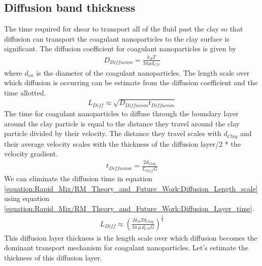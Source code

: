 \documentclass[letterpaper,10pt,english]{sphinxmanual}
\begin{document}
\subsection{Diffusion band thickness}
\label{\detokenize{Rapid_Mix/RM_Theory_and_Future_Work:diffusion-band-thickness}}
The time required for shear to transport all of the fluid past the clay so that diffusion can transport the coagulant nanoparticles to the clay surface is significant. The diffusion coefficient for coagulant nanoparticles is given by
\begin{equation}\label{equation:Rapid_Mix/RM_Theory_and_Future_Work:Rapid_Mix/RM_Theory_and_Future_Work:0}
\begin{split}D_{Diffusion} = \frac{k_B T}{3 \pi \mu d_{CN}}\end{split}
\end{equation}
where \(d_{cn}\) is the diameter of the coagulant nanoparticles. The length scale over which diffusion is occurring can be estimate from the diffusion coefficient and the time allotted.
\begin{equation}\label{equation:Rapid_Mix/RM_Theory_and_Future_Work:Diffusion_Length_scale}
\begin{split}L_{Diff} \approx \sqrt{D_{Diffusion} t_{Diffusion}}\end{split}
\end{equation}
The time for coagulant nanoparticles to diffuse through the boundary layer around the clay particle is equal to the distance they travel around the clay particle divided by their velocity. The distance they travel scales with \(d_{Clay}\) and their average velocity scales with the thickness of the diffusion layer/2 * the velocity gradient.
\begin{equation}\label{equation:Rapid_Mix/RM_Theory_and_Future_Work:Diffusion_Layer_time}
\begin{split}t_{Diffusion} = \frac{ 2d_{Clay}} {L_{Diff} G}\end{split}
\end{equation}
We can eliminate the diffusion time in equation \eqref{equation:Rapid_Mix/RM_Theory_and_Future_Work:Diffusion_Length_scale} using equation \eqref{equation:Rapid_Mix/RM_Theory_and_Future_Work:Diffusion_Layer_time}.
\begin{equation}\label{equation:Rapid_Mix/RM_Theory_and_Future_Work:Rapid_Mix/RM_Theory_and_Future_Work:1}
\begin{split}L_{Diff} \approx \left( \frac{2k_B T d_{Clay}}{3 \pi \,\mu  \, d_{CN} G}\right)^\frac{1}{3}\end{split}
\end{equation}
This diffusion layer thickness is the length scale over which diffusion becomes the dominant transport mechanism for coagulant nanoparticles. Let’s estimate the thickness of this diffusion layer.
\end{document}
